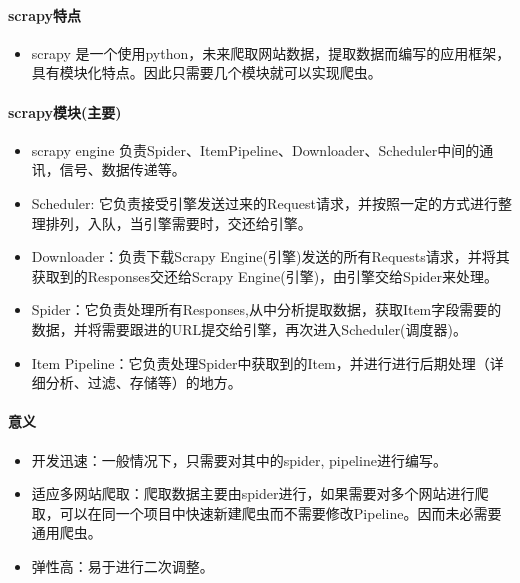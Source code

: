 \documentclass[UTF8]{ctexrep}
\begin{document}
\paragraph{scrapy特点}
\begin{itemize}
    \item scrapy 是一个使用python，未来爬取网站数据，提取数据而编写的应用框架，具有模块化特点。因此只需要几个模块就可以实现爬虫。
\end{itemize}
\par

\paragraph{scrapy模块(主要)}

\begin{itemize}
    \item scrapy engine 负责Spider、ItemPipeline、Downloader、Scheduler中间的通讯，信号、数据传递等。

    \item Scheduler: 它负责接受引擎发送过来的Request请求，并按照一定的方式进行整理排列，入队，当引擎需要时，交还给引擎。
    
    \item Downloader：负责下载Scrapy Engine(引擎)发送的所有Requests请求，并将其获取到的Responses交还给Scrapy Engine(引擎)，由引擎交给Spider来处理。
    
    \item Spider：它负责处理所有Responses,从中分析提取数据，获取Item字段需要的数据，并将需要跟进的URL提交给引擎，再次进入Scheduler(调度器)。
    
    \item Item Pipeline：它负责处理Spider中获取到的Item，并进行进行后期处理（详细分析、过滤、存储等）的地方。
\end{itemize}
\par

\paragraph{意义}
\begin{itemize}
    \item 开发迅速：一般情况下，只需要对其中的spider, pipeline进行编写。

    \item 适应多网站爬取：爬取数据主要由spider进行，如果需要对多个网站进行爬取，可以在同一个项目中快速新建爬虫而不需要修改Pipeline。因而未必需要通用爬虫。
    
    \item 弹性高：易于进行二次调整。
\end{itemize}
\par
\end{document}

